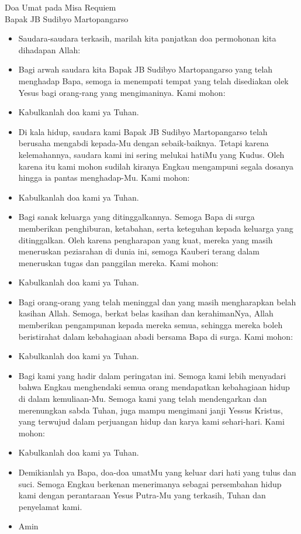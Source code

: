 \documentclass{article}
\newcommand{\BU}[1]{\begin{itemize} \item[U:] #1 \end{itemize}}
\newcommand{\BI}[1]{\begin{itemize} \item[I:] #1 \end{itemize}}
\newcommand{\BP}[1]{\begin{itemize} \item[P:] #1 \end{itemize}}
\newcommand{\arwah}{Bapak JB Sudibyo Martopangarso }
\begin{document}
\thispagestyle{empty}
\begin{center}\Large{Doa Umat pada Misa Requiem\\ \arwah }\end{center}

\vspace{0.5cm}
\BI{Saudara-saudara terkasih, marilah kita panjatkan doa permohonan kita dihadapan Allah:}

\BP{Bagi arwah saudara kita \arwah yang telah menghadap
Bapa, semoga ia menempati tempat yang telah disediakan olek Yesus bagi orang-rang yang
mengimaninya. Kami mohon:}

\BU{Kabulkanlah doa kami ya Tuhan.}

\BP{Di kala hidup, saudara kami \arwah telah berusaha mengabdi kepada-Mu dengan sebaik-baiknya. 
Tetapi karena kelemahannya, saudara kami ini sering melukai hatiMu yang Kudus. Oleh karena itu kami mohon 
sudilah kiranya Engkau mengampuni segala dosanya hingga ia pantas menghadap-Mu. Kami mohon:}

\BU{Kabulkanlah doa kami ya Tuhan.}

\BP{Bagi sanak keluarga yang ditinggalkannya. Semoga Bapa di surga memberikan penghiburan,
ketabahan, serta keteguhan kepada keluarga yang ditinggalkan.  Oleh karena  pengharapan yang
kuat, mereka yang masih meneruskan peziarahan di dunia ini, semoga Kauberi terang dalam meneruskan
tugas dan panggilan mereka. Kami mohon:}

\BU{Kabulkanlah doa kami ya Tuhan.}

\BP{Bagi orang-orang yang telah meninggal dan
yang masih mengharapkan belah kasihan Allah.
Semoga, berkat belas kasihan dan kerahimanNya,
Allah  memberikan pengampunan kepada
mereka semua, sehingga mereka boleh beristirahat dalam kebahagiaan abadi bersama Bapa
di surga. Kami mohon:}

\BU{Kabulkanlah doa kami ya Tuhan.}

\BP{Bagi kami yang hadir dalam peringatan ini.
Semoga kami lebih menyadari bahwa Engkau menghendaki semua orang mendapatkan kebahagiaan
hidup di dalam kemuliaan-Mu.
Semoga kami yang telah mendengarkan dan merenungkan sabda Tuhan, juga mampu mengimani
janji Yessus Kristus, yang terwujud dalam perjuangan hidup dan karya kami sehari-hari.
Kami mohon:}

\BU{Kabulkanlah doa kami ya Tuhan.}

\BI{Demikianlah ya Bapa, doa-doa umatMu yang keluar dari hati yang tulus dan suci. Semoga Engkau
berkenan menerimanya sebagai persembahan hidup kami dengan perantaraan Yesus Putra-Mu yang
terkasih, Tuhan dan penyelamat kami.}

\BU{Amin}
\end{document}
